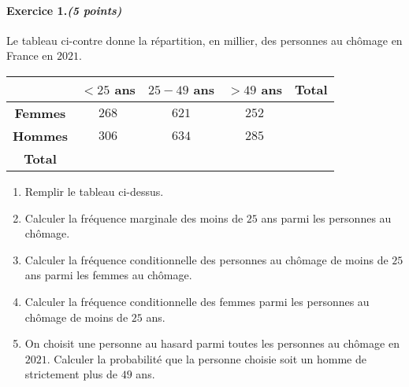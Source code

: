 \documentclass[11pt]{article}
\begin{document}
\paragraph{Exercice 1.\emph{(5 points)}}
  Le tableau ci-contre donne la répartition, en millier, des personnes au
  chômage en France en $2021$.
\begin{center}
\renewcommand{\arraystretch}{2}
\begin{tabular}{|c|c|c|c|c|}
  \cline{2-5}
  \multicolumn{1}{c|}{} & $<25$ \textbf{ans} & $25-49$ \textbf{ans} & $>49$
  \textbf{ans} & \phantom{S}\textbf{Total}\phantom{S} \\
  \hline
  \textbf{Femmes} & $268$ & $621$ & $252$ & \\
  \hline
  \textbf{Hommes} & $306$ & $634$ & $285$ & \\
  \hline
  \textbf{Total} & & & & \\
  \hline
\end{tabular}
\end{center}
  \begin{enumerate}
    \item Remplir le tableau ci-dessus.
    \item Calculer la fréquence marginale des moins de $25$ ans parmi les
      personnes au chômage.
    \item Calculer la fréquence conditionnelle des personnes au chômage de moins
      de $25$ ans parmi les femmes au chômage.
    \item Calculer la fréquence conditionnelle des femmes parmi les personnes au
      chômage de moins de $25$ ans.
    \item On choisit une personne au hasard parmi toutes les personnes au
      chômage en $2021$. Calculer la probabilité que la personne choisie soit un
      homme de strictement plus de $49$ ans.
\end{enumerate}
\end{document}
